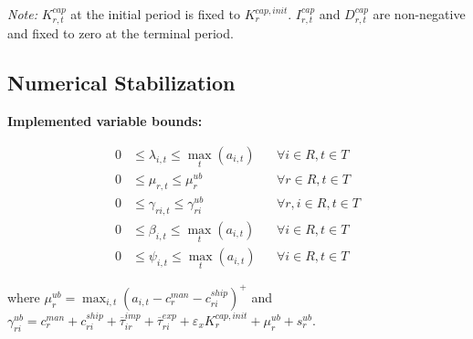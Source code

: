 \noindent\textit{Note:} $K^{cap}_{r,t}$ at the initial period is fixed to $K^{cap,init}_r$. $I^{cap}_{r,t}$ and $D^{cap}_{r,t}$ are non-negative and fixed to zero at the terminal period.

\subsection{Numerical Stabilization}

\begin{flushleft}
\textbf{Implemented variable bounds:}
\end{flushleft}
\begin{align}
0 &\le \lambda_{i,t} \le \max_{t} (a_{i,t}) && \forall i \in R, t \in T \\
0 &\le \mu_{r,t} \le \mu^{ub}_r && \forall r \in R, t \in T \\
0 &\le \gamma_{ri,t} \le \gamma^{ub}_{ri} && \forall r, i \in R, t \in T \\
0 &\le \beta_{i,t} \le \max_{t} (a_{i,t}) && \forall i \in R, t \in T \\
0 &\le \psi_{i,t} \le \max_{t} (a_{i,t}) && \forall i \in R, t \in T
\end{align}

\noindent where $\mu^{ub}_r = \max_{i,t} \left( a_{i,t} - c^{man}_r - c^{ship}_{ri} \right)^+$ and $\gamma^{ub}_{ri} = c^{man}_r + c^{ship}_{ri} + \overline{\tau}^{imp}_{ir} + \overline{\tau}^{exp}_{ri} + \varepsilon_x K^{cap,init}_r + \mu^{ub}_r + s^{ub}_r$.
    